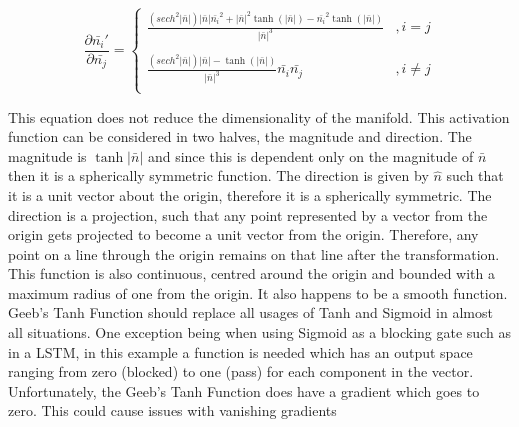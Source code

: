 \documentclass[onecolumn]{article}
\begin{document}
    \[\frac{\partial \bar{n_{i}}'}{\partial \bar{n_{j}}}=\left\{
    \begin{array}{ll}
        \frac{\left(sech^{2}|\bar{n}|\right)|\bar{n}|\bar{n_{i}}^{2}+|\bar{n}|^{2}\tanh\left( |\bar{n}|\right)-\bar{n_{i}}^{2}\tanh\left( |\bar{n}|\right)}{ |\bar{n}|^{3}} & ,i = j \\
        \\
        \frac{\left(sech^{2}|\bar{n}|\right)|\bar{n}|-\tanh\left(|\bar{n}|\right)}{ |\bar{n}|^{3}}\bar{n_{i}}\bar{n_{j}} & ,i \neq j \\
    \end{array} 
    \right. \]

    This equation does not reduce the dimensionality of the manifold. This activation function can be considered in two halves, the magnitude and direction. The magnitude is $\tanh|\bar{n}|$ and since this is dependent only on the magnitude of $\bar{n}$ then it is a spherically symmetric function. The direction is given by $\hat{n}$ such that it is a unit vector about the origin, therefore it is a spherically symmetric. The direction is a projection, such that any point represented by a vector from the origin gets projected to become a unit vector from the origin. Therefore, any point on a line through the origin remains on that line after the transformation. This function is also continuous, centred around the origin and bounded with a maximum radius of one from the origin. It also happens to be a smooth function.
    Geeb's Tanh Function should replace all usages of Tanh and Sigmoid in almost all situations. One exception being when using Sigmoid as a blocking gate such as in a LSTM, in this example a function is needed which has an output space ranging from zero (blocked) to one (pass) for each component in the vector.
    Unfortunately, the Geeb's Tanh Function does have a gradient which goes to zero. This could cause issues with vanishing gradients



\end{document}
